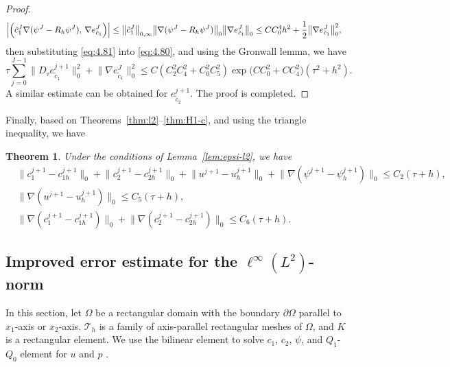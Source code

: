 \documentclass[a4paper,fleqn]{cas-sc}
\numberwithin{equation}{section}
\newtheorem{theorem}{Theorem}[section]
\theoremstyle{definition}
\begin{document}
\begin{proof}
\begin{align}
  \Bigl|\Bigl(\tilde{c}_{1}^{J}\nabla(\psi^{J} - R_{h}\psi^{J}),\,
              \nabla e_{\tilde{c}_{1}}^{J}\Bigr)\Bigr|
  &\leq \bigl\|\tilde{c}_{1}^{J}\bigr\|_{0,\infty}
         \bigl\|\nabla(\psi^{J} - R_{h}\psi^{J})\bigr\|_{0}
         \bigl\|\nabla e_{\tilde{c}_{1}}^{J}\bigr\|_{0}
  \leq CC_{0}^{4}h^{2} + \frac{1}{2}\bigl\|\nabla e_{\tilde{c}_{1}}^{J}\bigr\|_{0}^{2},
  \label{eq:4.81}
\end{align}
then substituting \eqref{eq:4.81} into \eqref{eq:4.80}, and using the Gronwall
lemma, we have
\begin{equation}\label{eq:4.82}
  \tau\sum_{j=0}^{J-1}\bigl\|D_{\tau}e_{\tilde{c}_{1}}^{j+1}\bigr\|_{0}^{2}
  + \bigl\|\nabla e_{\tilde{c}_{1}}^{J}\bigr\|_{0}^{2}
  \leq C(C_{2}^{2}C_{4}^{2} + C_{0}^{2}C_{5}^{2})
       \exp\!\bigl(CC_{0}^{2} + CC_{4}^{2}\bigr)(\tau^{2}+h^{2}).
\end{equation}
A similar estimate can be obtained for $e_{\tilde{c}_{2}}^{j+1}$. The proof is completed.
\end{proof}

Finally, based on Theorems~\ref{thm:l2}--\ref{thm:H1-c}, and using the triangle inequality,
we have

\begin{theorem}\label{thm:H1-all}
Under the conditions of Lemma~\ref{lem:epsi-l2}, we have
\begin{align}
  &\bigl\|c_{1}^{j+1} - c_{1h}^{j+1}\bigr\|_{0}
   + \bigl\|c_{2}^{j+1} - c_{2h}^{j+1}\bigr\|_{0}
   + \bigl\|u^{j+1} - u_{h}^{j+1}\bigr\|_{0}
   + \bigl\|\nabla(\psi^{j+1} - \psi_{h}^{j+1})\bigr\|_{0}
   \leq C_{2}(\tau + h),
  \label{eq:4.83}\\[4pt]
  &\bigl\|\nabla(u^{j+1} - u_{h}^{j+1})\bigr\|_{0}
   \leq C_{5}(\tau + h),
  \label{eq:4.84}\\[4pt]
  &\bigl\|\nabla(c_{1}^{j+1} - c_{1h}^{j+1})\bigr\|_{0}
   + \bigl\|\nabla(c_{2}^{j+1} - c_{2h}^{j+1})\bigr\|_{0}
   \leq C_{6}(\tau + h).
  \label{eq:4.85}
\end{align}
\end{theorem}

\subsection{Improved error estimate for the
  \texorpdfstring{$\ell^{\infty}(L^{2})$}{l-inf(L2)}-norm}

In this section, let $\Omega$ be a rectangular domain with the boundary $\partial\Omega$
parallel to $x_{1}$-axis or $x_{2}$-axis. $\mathcal{T}_{h}$ is a family of axis-parallel
rectangular meshes of $\Omega$, and $K$ is a rectangular element. We use the bilinear element
to solve $c_{1}$, $c_{2}$, $\psi$, and $Q_{1}$-$Q_{0}$ element for $u$ and $p$
\cite{John2016}.
\end{document}
